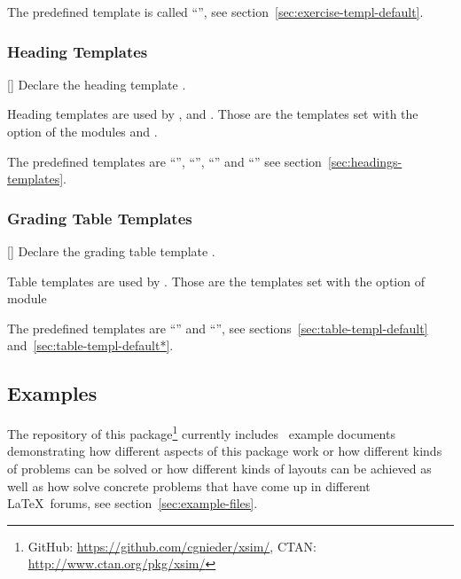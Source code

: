 \documentclass{xsim-manual}
\begin{document}
The predefined template is called \enquote{}, see
section~\vref{sec:exercise-templ-default}.

\subsubsection{Heading Templates}\label{sec:heading-templates}
\begin{commands}
  []
    Declare the heading template .
\end{commands}
Heading templates are used by ,  and
.  Those are the templates set with the option
 of the modules  and
.

The predefined templates are \enquote{},
\enquote{}, \enquote{} and
\enquote{} see section~\vref{sec:headings-templates}.

\subsubsection{Grading Table Templates}\label{sec:grad-table-templ}
\begin{commands}
  []
    Declare the grading table template .
\end{commands}
Table templates are used by .  Those are the templates set
with the option  of module 

The predefined templates are \enquote{} and
\enquote{}, see sections~\vref{sec:table-templ-default}
and~\vref{sec:table-templ-default*}.

\subsection{Examples}\label{sec:template-examples}

The repository of this package\footnote{GitHub:
  \url{https://github.com/cgnieder/xsim/}, CTAN:
  \url{http://www.ctan.org/pkg/xsim/}} currently includes
\theexamplefiles~example documents demonstrating how different aspects of this
package work or how different kinds of problems can be solved or how different
kinds of layouts can be achieved as well as how solve concrete problems that
have come up in different \LaTeX\ forums, see
section~\vref{sec:example-files}.
\end{document}
